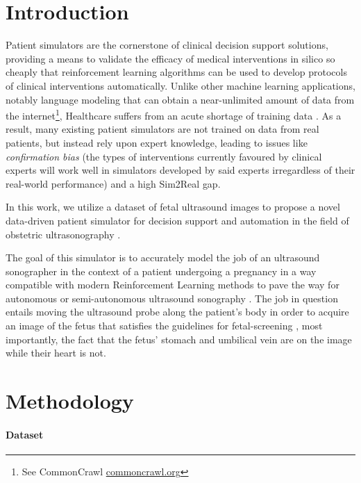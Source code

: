 \section{Introduction}

Patient simulators are the cornerstone of clinical decision support solutions, providing a means to validate the efficacy of medical interventions in silico so cheaply that reinforcement learning algorithms can be used to develop protocols of clinical interventions automatically.
Unlike other machine learning applications, notably language modeling that can obtain a near-unlimited amount of data from the internet\footnote{See CommonCrawl \cite{commoncrawl} \url{commoncrawl.org}}, Healthcare suffers from an acute shortage of training data \cite{datashortage}.
As a result, many existing patient simulators are not trained on data from real patients, but instead rely upon expert knowledge, leading to issues like \emph{confirmation bias} (the types of interventions currently favoured by clinical experts will work well in simulators developed by said experts irregardless of their real-world performance) and a high Sim2Real \cite{sim2real} gap.

In this work, we utilize a dataset of fetal ultrasound images to propose a novel data-driven patient simulator for decision support and automation in the field of obstetric ultrasonography \cite{obstetrics-sonography}.

The goal of this simulator is to accurately model the job of an ultrasound sonographer in the context of a patient undergoing a pregnancy in a way compatible with modern Reinforcement Learning methods \cite{liDeepReinforcementLearning2017}
to pave the way for autonomous or semi-autonomous ultrasound sonography \cite{autonomous-ultrasound-review}.
The job in question entails moving the ultrasound probe along the patient's body in order to acquire an image of the fetus that satisfies the guidelines for fetal-screening \cite{isoug-guidelines}, most importantly, the fact that the fetus' stomach and umbilical vein are on the image while their heart is not.

\newpage
\section{Methodology}

\paragraph{Dataset}

